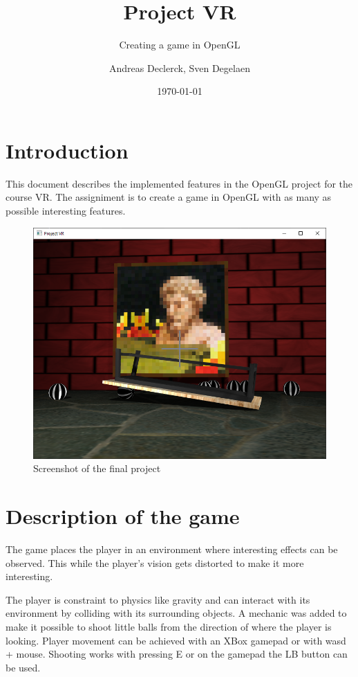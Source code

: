 \documentclass[]{article}
\title{Project VR}
\subtitle{Creating a game in OpenGL}
\author{Andreas Declerck, Sven Degelaen}
\date{\today}
\begin{document}
\maketitle

\section{Introduction}

This document describes the implemented features in the OpenGL project for the
course VR. The assigniment is to create a game in OpenGL with as many as possible
interesting features.

\begin{figure}[h!]
      \centering
      \includegraphics[width=\textwidth]{screenshot.png}
      \caption{Screenshot of the final project}
      \label{fig:screenshot}
\end{figure}

\section{Description of the game}

The game places the player in an environment where interesting effects can be
observed. This while the player's vision gets distorted to make it more
interesting.

The player is constraint to physics like gravity and can interact with its
environment by colliding with its surrounding objects. A mechanic was added
to make it possible to shoot little balls from the direction of where the
player is looking. Player movement can be achieved with an XBox gamepad or with
wasd + mouse. Shooting works with pressing E or on the gamepad the LB
button can be used.
\end{document}
